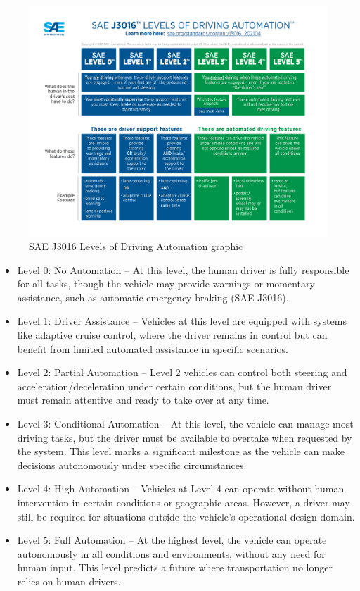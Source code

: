 \begin{figure}
    \centering
    \includegraphics[width=1\linewidth]{LateX//figs/sae-j3016-visual-chart_5.3.21.pdf}
    \caption{SAE J3016 Levels of Driving Automation graphic}
    \label{fig:enter-label}
\end{figure}

\begin{itemize}
    \item Level 0: No Automation – At this level, the human driver is fully responsible for all tasks, though the vehicle may provide warnings or momentary assistance, such as automatic emergency braking (SAE J3016).
    \item Level 1: Driver Assistance – Vehicles at this level are equipped with systems like adaptive cruise control, where the driver remains in control but can benefit from limited automated assistance in specific scenarios.
    \item Level 2: Partial Automation – Level 2 vehicles can control both steering and acceleration/deceleration under certain conditions, but the human driver must remain attentive and ready to take over at any time.
    \item Level 3: Conditional Automation – At this level, the vehicle can manage most driving tasks, but the driver must be available to overtake when requested by the system. This level marks a significant milestone as the vehicle can make decisions autonomously under specific circumstances.
    \item Level 4: High Automation – Vehicles at Level 4 can operate without human intervention in certain conditions or geographic areas. However, a driver may still be required for situations outside the vehicle's operational design domain.
    \item Level 5: Full Automation – At the highest level, the vehicle can operate autonomously in all conditions and environments, without any need for human input. This level predicts a future where transportation no longer relies on human drivers.
\end{itemize}


